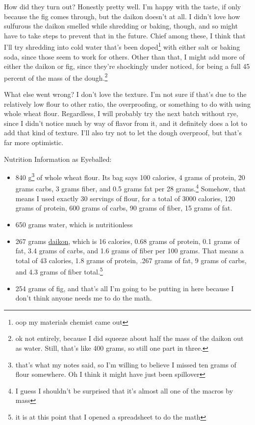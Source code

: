\documentclass[12pt]{article}[titlepage]
\renewcommand{\,}{\textsuperscript{,}}
\begin{document}
How did they turn out?  
Honestly pretty well.  
I'm happy with the taste, if only because the fig comes through, but the daikon doesn't at all.  
I didn't love how sulfurous the daikon smelled while shredding or baking, though, and so might have to take steps to prevent that in the future.  
Chief among these, I think that I'll try shredding into cold water that's been doped\footnote{oop my materials chemist came out} with either salt or baking soda, since those seem to work for others.  
Other than that, I might add more of either the daikon or fig, since they're shockingly under noticed, for being a full 45 percent of the mass of the dough.\footnote{ok not entirely, because I did squeeze about half the mass of the daikon out as water. Still, that's like 400 grams, so still one part in three.}

What else went wrong?  
I don't love the texture.   
I'm not sure if that's due to the relatively low flour to other ratio, the overproofing, or something to do with using whole wheat flour.  
Regardless, I will probably try the next batch without rye, since I didn't notice much by way of flavor from it, and it definitely does a lot to add that kind of texture.  
I'll also try not to let the dough overproof, but that's far more optimistic.

Nutrition Information as Eyeballed:  
\begin{itemize}  
\item 840 g\footnote{that's what my notes said, so I'm willing to believe I missed ten grams of flour somewhere. Oh I think it might have just been spillover} of whole wheat flour. Its bag says 100 calories, 4 grams of protein, 20 grams carbs, 3 grams fiber, and 0.5 grams fat per 28 grams.\footnote{I guess I shouldn't be surprised that it's almost all one of the macros by mass}  
Somehow, that means I used exactly 30 servings of flour, for a total of 3000 calories, 120 grams of protein, 600 grams of carbs, 90 grams of fiber, 15 grams of fat.  
\item 650 grams water, which is nutritionless  
\item 267 grams \href{https://fdc.nal.usda.gov/food-details/2709803/nutrients}{daikon}, which is 16 calories, 0.68 grams of protein, 0.1 grams of fat, 3.4 grams of carbs, and 1.6 grams of fiber per 100 grams. That means a total of 43 calories, 1.8 grams of protein, .267 grams of fat, 9 grams of carbs, and 4.3 grams of fiber total.\footnote{it is at this point that I opened a spreadsheet to do the math}  
\item 254 grams of fig, and that's all I'm going to be putting in here because I don't think anyone needs me to do the math.\end{itemize}
\end{document}
